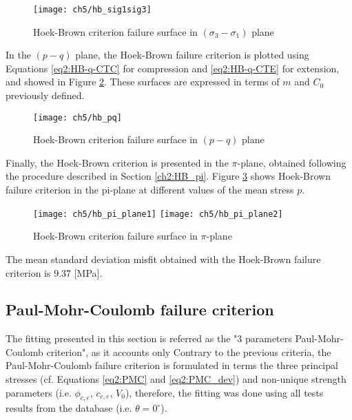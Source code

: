 \begin{figure}[p]
    \centering
    \texttt{[image: ch5/hb\_sig1sig3]}
    \caption{Hoek-Brown criterion failure surface in  $(\sigma_3-\sigma_1)$ plane}
    \label{fig5:hb_sig1sig3}
\end{figure} 

In the $(p-q)$ plane, the Hoek-Brown failure criterion is plotted using Equations \ref{eq2:HB-q-CTC} for compression and \ref{eq2:HB-q-CTE} for extension, and showed in Figure \ref{fig5:hb_pq}. These surfaces are expressed in terms of $m$ and $C_0$ previously defined. 

\begin{figure}[p]
    \centering
    \texttt{[image: ch5/hb\_pq]}
    \caption{Hoek-Brown criterion failure surface in  $(p-q)$ plane}
    \label{fig5:hb_pq}
\end{figure} 

Finally, the Hoek-Brown criterion is presented in the $\pi$-plane, obtained following the procedure described in Section \ref{ch2:HB_pi}. Figure \ref{fig5:hb_pi_plane} shows Hoek-Brown failure criterion in the pi-plane at different values of the mean stress $p$.

\begin{figure}[tb]
    \centering
    \texttt{[image: ch5/hb\_pi\_plane1]}
    \texttt{[image: ch5/hb\_pi\_plane2]}
    \caption{Hoek-Brown criterion failure surface in  $\pi$-plane}
    \label{fig5:hb_pi_plane}
\end{figure} 

The mean standard deviation misfit obtained with the Hoek-Brown failure criterion is $9.37$ [\si{\mega\pascal}]. 

\subsection{Paul-Mohr-Coulomb failure criterion}\label{ch5:3p_pmc}

The fitting presented in this section is referred as the "3 parameters Paul-Mohr-Coulomb criterion", as it accounts only 
Contrary to the previous criteria, the Paul-Mohr-Coulomb failure criterion is formulated in terms the three principal stresses (cf. Equations \ref{eq2:PMC} and \ref{eq2:PMC_dev}) and non-unique strength parameters (i.e. $\phi_{c,e}$, $c_{c,e}$, $V_0$), therefore, the fitting was done using all tests results from the database (i.e. $\theta = 0^\circ$). 

